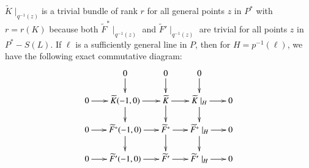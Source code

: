 \begin{Proof}
\subsubsection{}\label{eqn4.8.5}
$\widetilde{K}\mid_{q^{-1}(z)}$\pageoriginale is a trivial bundle of rank $r$
for all general points $z$ in $P^{\ast}$ with $r=r(K)$
because both $\widetilde{F}^{\ast}\mid_{q^{-1}(z)}$ and
$\widetilde{F}'\mid_{q^{-1}(z)}$ are trivial for all points $z$ in
$P^{\ast}-S(L)$. If $\ell$ is a sufficiently general line in $P$, then
for $H= p^{-1}(\ell)$, we have the following exact commutative
diagram: 
\setcounter{equation}{5}
\begin{equation}\label{eqn4.8.6}
\vcenter{
\xymatrix@=.6cm{&0\ar[d]&0\ar[d]&0\ar[d]&\\
0\ar[r]&\widetilde{K}(-1,0)\ar[d]\ar[r]&
  \widetilde{K}\ar[d]\ar[r]&\widetilde{K}\mid_H\ar[d]\ar[r]& 0\\
0\ar[r]&\widetilde{F}^{\ast}(-1,0)\ar[d]\ar[r]& \widetilde{F}^{\ast}\ar[d]\ar[r]&
\widetilde{F}^{\ast}\mid_H\ar[d]\ar[r]&0\\
0\ar[r]&\widetilde{F}'(-1,0)\ar[r]& \widetilde{F}'\ar[r]& \widetilde{F}'\mid_{H}\ar[r]&0\\
}}
\end{equation}


\end{Proof}
